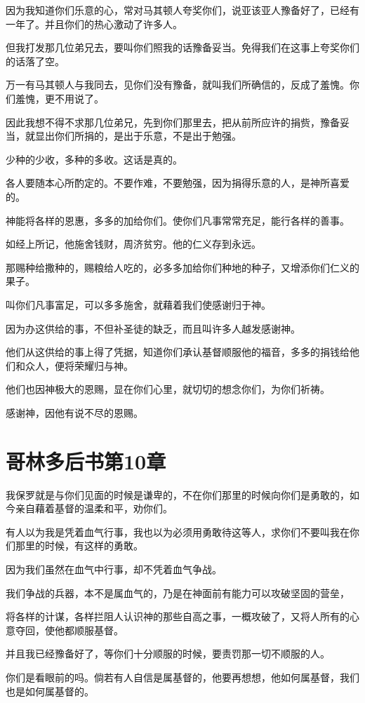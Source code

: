 \documentclass[12pt,oneside]{book}
\begin{document}
因为我知道你们乐意的心，常对马其顿人夸奖你们，说亚该亚人豫备好了，已经有一年了。并且你们的热心激动了许多人。

但我打发那几位弟兄去，要叫你们照我的话豫备妥当。免得我们在这事上夸奖你们的话落了空。

万一有马其顿人与我同去，见你们没有豫备，就叫我们所确信的，反成了羞愧。你们羞愧，更不用说了。

因此我想不得不求那几位弟兄，先到你们那里去，把从前所应许的捐赀，豫备妥当，就显出你们所捐的，是出于乐意，不是出于勉强。

少种的少收，多种的多收。这话是真的。

各人要随本心所酌定的。不要作难，不要勉强，因为捐得乐意的人，是神所喜爱的。

神能将各样的恩惠，多多的加给你们。使你们凡事常常充足，能行各样的善事。

如经上所记，他施舍钱财，周济贫穷。他的仁义存到永远。

那赐种给撒种的，赐粮给人吃的，必多多加给你们种地的种子，又增添你们仁义的果子。

叫你们凡事富足，可以多多施舍，就藉着我们使感谢归于神。

因为办这供给的事，不但补圣徒的缺乏，而且叫许多人越发感谢神。

他们从这供给的事上得了凭据，知道你们承认基督顺服他的福音，多多的捐钱给他们和众人，便将荣耀归与神。

他们也因神极大的恩赐，显在你们心里，就切切的想念你们，为你们祈祷。

感谢神，因他有说不尽的恩赐。

\chapter{哥林多后书第10章}
我保罗就是与你们见面的时候是谦卑的，不在你们那里的时候向你们是勇敢的，如今亲自藉着基督的温柔和平，劝你们。

有人以为我是凭着血气行事，我也以为必须用勇敢待这等人，求你们不要叫我在你们那里的时候，有这样的勇敢。

因为我们虽然在血气中行事，却不凭着血气争战。

我们争战的兵器，本不是属血气的，乃是在神面前有能力可以攻破坚固的营垒，

将各样的计谋，各样拦阻人认识神的那些自高之事，一概攻破了，又将人所有的心意夺回，使他都顺服基督。

并且我已经豫备好了，等你们十分顺服的时候，要责罚那一切不顺服的人。

你们是看眼前的吗。倘若有人自信是属基督的，他要再想想，他如何属基督，我们也是如何属基督的。
\end{document}
